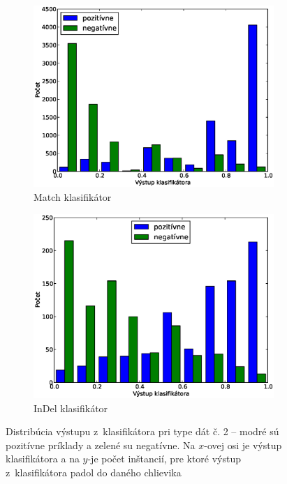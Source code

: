 \begin{figure}[htp]
        \centering
        \begin{subfigure}[t]{0.4\textwidth}
                \includegraphics[width=\textwidth]{images/clf_fi/randomforest_cmp_5_test}
                \caption{Match klasifikátor}
                \label{fig:datatype2-out-m}
        \end{subfigure}%
        \qquad\qquad %
        \begin{subfigure}[t]{0.4\textwidth}
                \includegraphics[width=\textwidth]{images/clf_fi/randomforest_cmp_5_indel_test}
                \caption{InDel klasifikátor}
                \label{fig:datatype2-out-i}
        \end{subfigure}
        \caption[Distribúcia výstupu z~klasifikátora pri type dát č. 2]{Distribúcia výstupu z~klasifikátora pri type dát č. 2 -- modré sú pozitívne príklady a zelené su negatívne. Na $x$-ovej osi je výstup klasifikátora a na $y$-je počet inštancií, pre ktoré výstup z~klasifikátora padol do daného chlievika}
        \label{fig:datatype2-out}
\end{figure}

